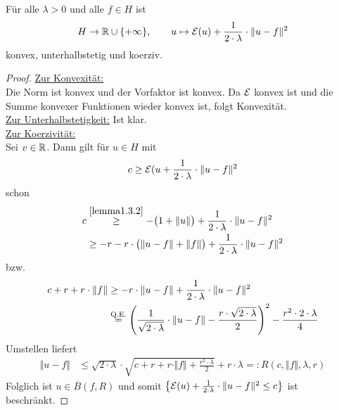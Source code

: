\begin{lemma}
Für alle $\lambda>0$ und alle $f\in H$ ist
\begin{align*}
H\to\mathbb{R}\cup\lbrace+\infty\rbrace,\qquad u\mapsto\mathcal{E}(u)+\frac{1}{2\cdot\lambda}\cdot\Vert u-f\Vert^2
\end{align*}
konvex, unterhalbstetig und koerziv.
\end{lemma}
\begin{proof}
\underline{Zur Konvexität:}\\
Die Norm ist konvex und der Vorfaktor ist konvex. Da $\mathcal{E}$ konvex ist und die Summe konvexer Funktionen wieder konvex ist, folgt Konvexität.\\

\underline{Zur Unterhalbstetigkeit:} Ist klar.\\

\underline{Zur Koerzivität:}\\
Sei $v\in\mathbb{R}$. Dann gilt für $u\in H$ mit
\begin{align*}
c\geq\mathcal{E}(u+\frac{1}{2\cdot \lambda}\cdot\Vert u-f\Vert^2
\end{align*}
schon
\begin{align*}
c&\stackrel{\ref{lemma1.3.2}}{\geq} -\big(1+\Vert u\Vert\big)+\frac{1}{2\cdot\lambda}\cdot\Vert u-f\Vert^2\\
&\geq -r-r\cdot\big(\Vert u-f\Vert+\Vert f\Vert\big)+\frac{1}{2\cdot\lambda}\cdot\Vert u-f\Vert^2
\end{align*}
bzw.
\begin{align*}
c+r+r\cdot\Vert f\Vert &\geq -r\cdot\Vert u-f\Vert+\frac{1}{2\cdot\lambda}\cdot\Vert u-f\Vert^2\\
&\stackrel{\text{Q.E.}}{=}\left(\frac{1}{\sqrt{2\cdot\lambda}}\cdot\Vert u-f\Vert-\frac{r\cdot\sqrt{2\cdot\lambda}}{2}\right)^2-\frac{r^2\cdot 2\cdot\lambda}{4}
\end{align*}
Umstellen liefert
\begin{align*}
\Vert u-f\Vert&\leq\sqrt{2\cdot\lambda}\cdot\sqrt{c+r+r\cdot\Vert f\Vert+\frac{r^2\cdot\lambda}{2}}+r\cdot\lambda=:R(c,\Vert f\Vert,\lambda, r)
\end{align*}
Folglich ist $u\in\overline{B}(f,R)$ und somit $\left\lbrace\mathcal{E}(u)+\frac{1}{2\cdot\lambda}\cdot\Vert u-f\Vert^2\leq c\right\rbrace$ ist beschränkt.
\end{proof}

